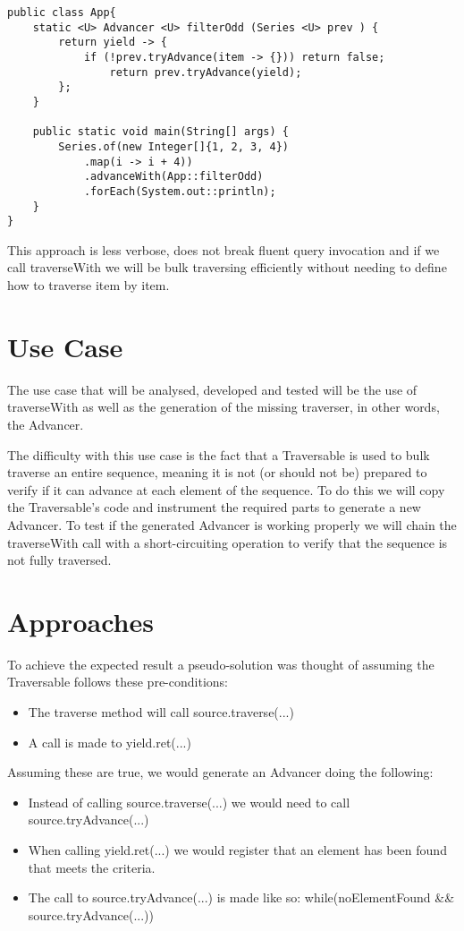 \begin{lstlisting}[caption={filterOdd using advanceWith},captionpos=b]
public class App{
	static <U> Advancer <U> filterOdd (Series <U> prev ) {
		return yield -> {
			if (!prev.tryAdvance(item -> {})) return false;
				return prev.tryAdvance(yield);
		};
	}

	public static void main(String[] args) {
		Series.of(new Integer[]{1, 2, 3, 4})
            .map(i -> i + 4))
            .advanceWith(App::filterOdd)
            .forEach(System.out::println);
	}
}
\end{lstlisting}

This approach is less verbose, does not break fluent query invocation and if we call traverseWith we will be bulk traversing efficiently without needing to define how to traverse item by item.

\section{Use Case}
The use case that will be analysed, developed and tested will be the use of traverseWith as well as the generation of the missing traverser, in other words, the Advancer.

The difficulty with this use case is the fact that a Traversable is used to bulk traverse an entire sequence, meaning it is not (or should not be) prepared to verify if it can advance at each element of the sequence. To do this we will copy the Traversable's code and instrument the required parts to generate a new Advancer. To test if the generated Advancer is working properly we will chain the traverseWith call with a short-circuiting operation to verify that the sequence is not fully traversed.

\section{Approaches}
To achieve the expected result a pseudo-solution was thought of assuming the Traversable follows these pre-conditions:
\begin{itemize}
\item The traverse method will call source.traverse(...)
\item A call is made to yield.ret(...)
\end{itemize}

Assuming these are true, we would generate an Advancer doing the following:
\begin{itemize}
\item Instead of calling source.traverse(...) we would need to call source.tryAdvance(...)
\item When calling yield.ret(...) we would register that an element has been found that meets the criteria.
\item The call to source.tryAdvance(...) is made like so: while(noElementFound \&\& source.tryAdvance(...))
\end{itemize}

